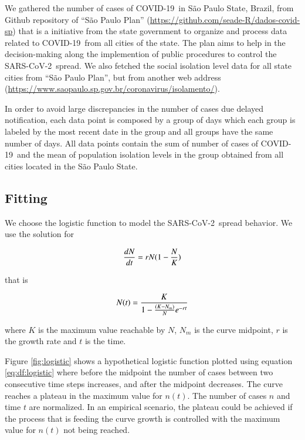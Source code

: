 \documentclass[review]{elsarticle}
\def\covid{\hbox{COVID-19}} %
\def\sarscov{{SARS-CoV-2}}
\begin{document}
We gathered the number of cases of \covid\ 
in S\~{a}o Paulo State, Brazil, 
from Github repository of ``S\~{a}o Paulo Plan'' 
(\url{https://github.com/seade-R/dados-covid-sp}) 
that is a initiative from the state government 
to organize and process data related to \covid \
from all cities of the state. 
The plan aims to help in the decision-making 
along the implemention of public 
procedures to control the \sarscov\ spread. 
We also fetched the social isolation level data 
for all state cities  from 
``S\~{a}o Paulo Plan'', but from another web address 
(\url{https://www.saopaulo.sp.gov.br/coronavirus/isolamento/}).

In order to avoid large discrepancies 
in the number of cases due delayed notification, 
 each data point is composed by a group of days 
 which each group is labeled by the most 
 recent date in the group and 
 all groups have the same number of days. 
 All data points contain the sum of number 
 of cases of \covid\ and 
 the mean of population isolation levels 
 in the group obtained from all cities 
 located in the S\~{a}o Paulo State.

\subsection{Fitting}

We choose the logistic function to model 
the \sarscov\ spread behavior. We use the 
solution for

\begin{equation}
{dN \over dt} = r N (1 - {N \over K})
\label{eq:df:logistic}
\end{equation}

\noindent that is

\begin{equation}
N(t) = {K \over {1- {(K-N_{m}) \over N} e^{-rt}}}
\label{eq:exp:logistic}
\end{equation}

\noindent where $K$ is the maximum value reachable by $N$, 
$N_m$ is the curve midpoint, 
$r$ is the growth rate 
and $t$ is the time.

Figure \ref{fig:logistic} shows a hypothetical logistic function 
plotted using equation \ref{eq:df:logistic} where before the midpoint 
the number of cases between 
two consecutive time steps increases, 
and after the midpoint decreases. 
The curve reaches a plateau in the maximum value for $n(t)$. 
The number of cases $n$ and time $t$ are normalized.
In an empirical scenario, the plateau could be achieved 
if the process that is feeding the curve 
growth is controlled with the maximum 
value for $n(t)$ not being reached.
\end{document}
